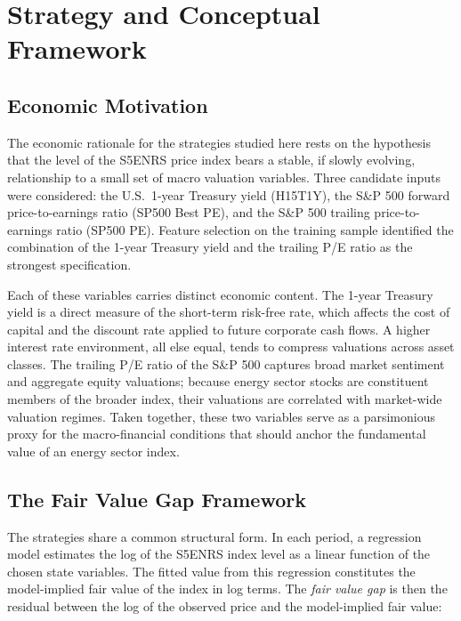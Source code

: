 \documentclass[12pt]{article}
\begin{document}
\section{Strategy and Conceptual Framework}
\label{sec:framework}

\subsection{Economic Motivation}

The economic rationale for the strategies studied here rests on the hypothesis that the level of the S5ENRS price index bears a stable, if slowly evolving, relationship to a small set of macro valuation variables. Three candidate inputs were considered: the U.S.\ 1-year Treasury yield (H15T1Y), the S\&P 500 forward price-to-earnings ratio (SP500 Best PE), and the S\&P 500 trailing price-to-earnings ratio (SP500 PE). Feature selection on the training sample identified the combination of the 1-year Treasury yield and the trailing P/E ratio as the strongest specification.

Each of these variables carries distinct economic content. The 1-year Treasury yield is a direct measure of the short-term risk-free rate, which affects the cost of capital and the discount rate applied to future corporate cash flows. A higher interest rate environment, all else equal, tends to compress valuations across asset classes. The trailing P/E ratio of the S\&P 500 captures broad market sentiment and aggregate equity valuations; because energy sector stocks are constituent members of the broader index, their valuations are correlated with market-wide valuation regimes. Taken together, these two variables serve as a parsimonious proxy for the macro-financial conditions that should anchor the fundamental value of an energy sector index.

\subsection{The Fair Value Gap Framework}

The strategies share a common structural form. In each period, a regression model estimates the log of the S5ENRS index level as a linear function of the chosen state variables. The fitted value from this regression constitutes the model-implied fair value of the index in log terms. The \emph{fair value gap} is then the residual between the log of the observed price and the model-implied fair value:
\end{document}
